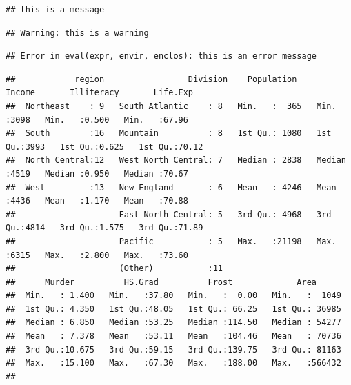 \documentclass[twoside]{extreport}
\begin{document}
\begin{verbatim}
## this is a message
\end{verbatim}

\begin{Shaded}
\begin{Highlighting}[]
\NormalTok{(}\NormalTok{)}
\end{Highlighting}
\end{Shaded}

\begin{verbatim}
## Warning: this is a warning
\end{verbatim}

\begin{Shaded}
\begin{Highlighting}[]
\NormalTok{(}\NormalTok{)}
\end{Highlighting}
\end{Shaded}

\begin{verbatim}
## Error in eval(expr, envir, enclos): this is an error message
\end{verbatim}

\begin{Shaded}
\begin{Highlighting}[]
\NormalTok{ (}
\NormalTok{\} }\NormalTok{ \{}
  \NormalTok{(}\NormalTok{)}
\NormalTok{\}}
\end{Highlighting}
\end{Shaded}

\begin{verbatim}
##            region                 Division    Population        Income       Illiteracy       Life.Exp    
##  Northeast    : 9   South Atlantic    : 8   Min.   :  365   Min.   :3098   Min.   :0.500   Min.   :67.96  
##  South        :16   Mountain          : 8   1st Qu.: 1080   1st Qu.:3993   1st Qu.:0.625   1st Qu.:70.12  
##  North Central:12   West North Central: 7   Median : 2838   Median :4519   Median :0.950   Median :70.67  
##  West         :13   New England       : 6   Mean   : 4246   Mean   :4436   Mean   :1.170   Mean   :70.88  
##                     East North Central: 5   3rd Qu.: 4968   3rd Qu.:4814   3rd Qu.:1.575   3rd Qu.:71.89  
##                     Pacific           : 5   Max.   :21198   Max.   :6315   Max.   :2.800   Max.   :73.60  
##                     (Other)           :11                                                                 
##      Murder          HS.Grad          Frost             Area       
##  Min.   : 1.400   Min.   :37.80   Min.   :  0.00   Min.   :  1049  
##  1st Qu.: 4.350   1st Qu.:48.05   1st Qu.: 66.25   1st Qu.: 36985  
##  Median : 6.850   Median :53.25   Median :114.50   Median : 54277  
##  Mean   : 7.378   Mean   :53.11   Mean   :104.46   Mean   : 70736  
##  3rd Qu.:10.675   3rd Qu.:59.15   3rd Qu.:139.75   3rd Qu.: 81163  
##  Max.   :15.100   Max.   :67.30   Max.   :188.00   Max.   :566432  
## 
\end{verbatim}
\end{document}
